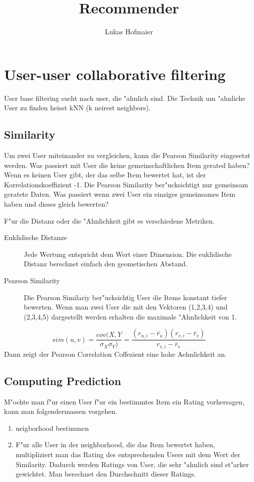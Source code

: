 \documentclass[a4paper, 11pt]{article}
\author{Lukas Hofmaier}
\title{Recommender}
\begin{document}
\maketitle
\section{User-user collaborative filtering}
User base filtering sucht nach user, die "ahnlich sind. 
Die Technik um "ahnliche User zu finden heisst kNN (k neirest neighbors).
\subsection{Similarity}
Um zwei User miteinander zu vergleichen, kann die Pearson Similarity eingesetzt werden.
Was passiert mit User die keine gemeinschaftlichen Item gerated haben? 
Wenn es keinen User gibt, der das selbe Item bewertet hat, ist der Korrelationskoeffizient -1.
Die Pearson Similarity ber"ucksichtigt nur gemeinsam geratete Daten.
Was passiert wenn zwei User ein einziges gemeinsames Item haben und dieses gleich bewerten?

F"ur die Distanz oder die "Ahnlichkeit gibt es verschiedene Metriken. 
\begin{description}
\item[Euklidische Distanze] Jede Wertung entspricht dem Wert einer Dimension. Die euklidische Distanz berechnet einfach den geometischen Abstand.
\item[Pearson Similarity] Die Pearson Similariy ber"ucksichtig User die Items konstant tiefer bewerten. Wenn man zwei User die mit den Vektoren (1,2,3,4) und (2,3,4,5) dargestellt werden erhalten die maximale "Ahnlichkeit von 1.
\end{description}

\begin{equation}
 sim(u,v) = \frac{cov(X,Y}{\sigma_X \sigma_Y)} = \frac{(r_{u,i} - \bar{r}_u)(r_{v,i} - \bar{r}_v)}{r_{v,i} - \bar{r}_v}    
\end{equation}
Dann zeigt der Pearson Correlation Coffezient eine hohe Aehnlichkeit an.

\subsection{Computing Prediction}
\label{sec:compp}

M"ochte man f"ur einen User f"ur ein bestimmtes Item ein Rating vorhersagen, kann man folgendermassen vorgehen.

\begin{enumerate}
\item neigborhood bestimmen
\item F"ur alle User in der neighborhood, die das Item bewertet haben, multipliziert man das Rating des entsprechenden Users mit dem Wert der Similarity. Dadurch werden Ratings von User, die sehr "ahnlich sind st"arker gewichtet. Man berechnet den Durchschnitt dieser Ratings.

\end{enumerate}
\end{document}
